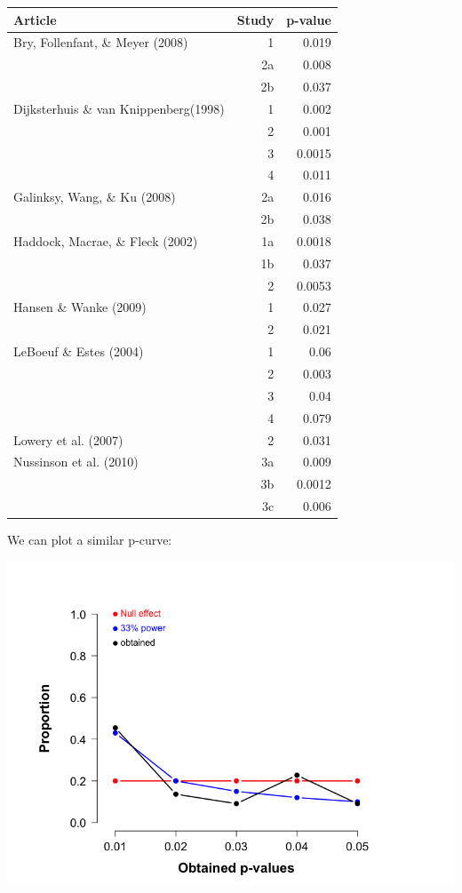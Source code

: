 \documentclass[article,10pt]{article}
\begin{document}
\begin{center}
\begin{tabular}{lrr}
Article & Study & p-value\\
\hline
Bry, Follenfant, \& Meyer (2008) & 1 & 0.019\\
 & 2a & 0.008\\
 & 2b & 0.037\\
Dijksterhuis \& van Knippenberg(1998) & 1 & 0.002\\
 & 2 & 0.001\\
 & 3 & 0.0015\\
 & 4 & 0.011\\
Galinksy, Wang, \& Ku (2008) & 2a & 0.016\\
 & 2b & 0.038\\
Haddock, Macrae, \& Fleck (2002) & 1a & 0.0018\\
 & 1b & 0.037\\
 & 2 & 0.0053\\
Hansen \& Wanke (2009) & 1 & 0.027\\
 & 2 & 0.021\\
LeBoeuf \& Estes (2004) & 1 & 0.06\\
 & 2 & 0.003\\
 & 3 & 0.04\\
 & 4 & 0.079\\
Lowery et al. (2007) & 2 & 0.031\\
Nussinson et al. (2010) & 3a & 0.009\\
 & 3b & 0.0012\\
 & 3c & 0.006\\
\end{tabular}
\end{center}


We can plot a similar p-curve:

\includegraphics[width=.9\linewidth]{figures/p-curve-professor.png}
\end{document}
